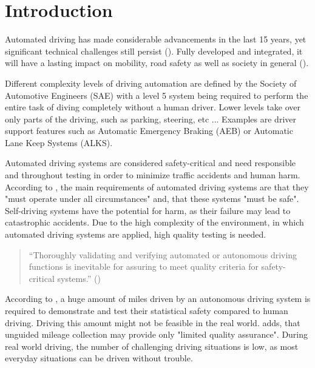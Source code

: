 \chapter{Introduction}
Automated driving has made considerable advancements in the last 15 years, yet significant technical challenges still persist (\cite{ayoub_manual_2019}).
Fully developed and integrated, it will have a lasting impact on mobility, road safety as well as society in general (\cite{milakis_policy_2017}).

Different complexity levels of driving automation are defined by the Society of Automotive Engineers (SAE)  with a level 5 system being required to perform the entire task of diving completely without a human driver. Lower levels take over only parts of the driving, such as parking, steering, etc ... Examples are driver support features such as Automatic Emergency Braking (AEB) or Automatic Lane Keep Systems (ALKS).

Automated driving systems are considered safety-critical and need responsible and throughout testing in order to minimize traffic accidents and human harm. According to \cite{kluck_search-based_2022}, the main requirements of automated driving systems are that they "must operate under all circumstances" and, that these systems "must be safe". Self-driving systems have the potential for harm, as their failure may lead to catastrophic accidents. Due to the high complexity of the environment, in which automated driving systems are applied, high quality testing is needed. 

\begin{quote}
	\begin{em}
		\enquote{Thoroughly validating and verifying automated or autonomous driving functions is inevitable for assuring to meet quality criteria for safety-critical systems.} (\cite{felbinger_comparing_2019})
	\end{em}
\end{quote}

According to \cite{kalra_driving_2016}, a huge amount of miles driven by an autonomous driving system is required to demonstrate and test their statistical safety compared to human driving. Driving this amount might not be feasible in the real world.
\cite{kluck_search-based_2022} adds, that unguided mileage collection may provide only "limited quality assurance". During real world driving, the number of challenging driving situations is low, as most everyday situations can be driven without trouble.

